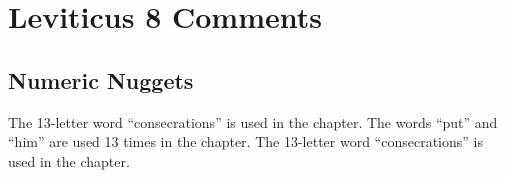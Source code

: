 \section{Leviticus 8 Comments}

\subsection{Numeric Nuggets}
The 13-letter word ``consecrations'' is used in the chapter. The words ``put'' and ``him'' are used 13 times in the chapter. The 13-letter word ``consecrations'' is used in the chapter.

